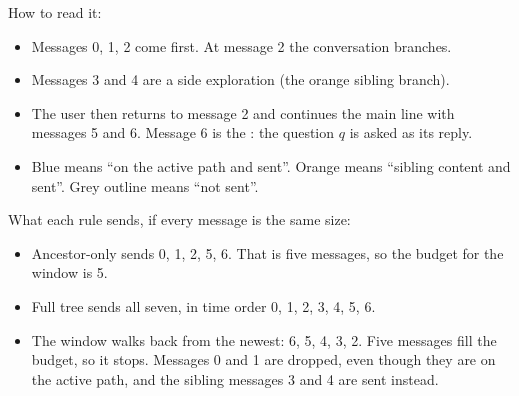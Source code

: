 \begin{center}
\end{center}

How to read it:
\begin{itemize}
\item Messages 0, 1, 2 come first. At message 2 the conversation branches.
\item Messages 3 and 4 are a side exploration (the orange sibling branch).
\item The user then returns to message 2 and continues the main line with messages 5 and 6. Message 6 is the : the question $q$ is asked as its reply.
\item Blue means ``on the active path and sent''. Orange means ``sibling content and sent''. Grey outline means ``not sent''.
\end{itemize}

What each rule sends, if every message is the same size:
\begin{itemize}
\item Ancestor-only sends 0, 1, 2, 5, 6. That is five messages, so the budget for the window is 5.
\item Full tree sends all seven, in time order 0, 1, 2, 3, 4, 5, 6.
\item The window walks back from the newest: 6, 5, 4, 3, 2. Five messages fill the budget, so it stops. Messages 0 and 1 are dropped, even though they are on the active path, and the sibling messages 3 and 4 are sent instead.
\end{itemize}

